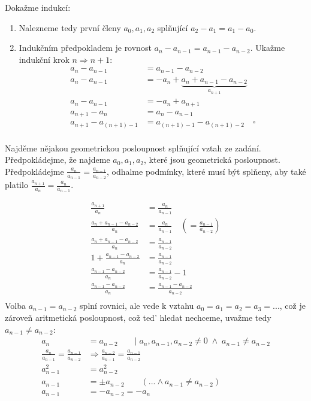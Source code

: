 \documentclass[12pt]{article}
\begin{document}
\begin{enumerate}
\begin{enumerate}
      Dokažme indukcí:
      \begin{enumerate}
        \item Nalezneme tedy první členy $a_0, a_1, a_2$ splňující $a_2-a_1=a_1-a_0$.
        \item Indukčním předpokladem je rovnost $a_n - a_{n-1} = a_{n-1} - a_{n-2}$.
          Ukažme indukční krok $n \Rightarrow n+1$:
          \begin{align*}
            a_n - a_{n-1} &= a_{n-1} - a_{n-2} \\
            a_n - a_{n-1} &= -a_n + \underbrace{a_n + a_{n-1} - a_{n-2}}_{a_{n+1}} \\
            a_n - a_{n-1} &= - a_n + a_{n+1}  \\
            a_{n+1} - a_n &= a_n - a_{n-1} \\
            a_{n+1} - a_{(n+1)-1} &= a_{(n+1)-1} - a_{(n+1)-2} \quad \square\\
          \end{align*}
      \end{enumerate}

      Najděme nějakou geometrickou posloupnost splňující vztah ze zadání.
      Předpokládejme, že najdeme $a_0,a_1,a_2$, které jsou geometrická posloupnost.
      Předpokládejme $\frac{a_n}{a_{n-1}}=\frac{a_{n-1}}{a_{n-2}}$, odhalme podmínky,
      které musí být splňeny, aby také platilo $\frac{a_{n+1}}{a_n} = \frac{a_n}{a_{n-1}}$.

      \begin{align*}
        \frac{a_{n+1}}{a_n} &= \frac{a_n}{a_{n-1}} \\
        \frac{a_n+a_{n-1}-a_{n-2}}{a_n} &= \frac{a_n}{a_{n-1}} \quad\left(= \frac{a_{n-1}}{a_{n-2}}\right) \\
        \frac{a_n+a_{n-1}-a_{n-2}}{a_n} &= \frac{a_{n-1}}{a_{n-2}} \\
        1 + \frac{a_{n-1}-a_{n-2}}{a_n} &= \frac{a_{n-1}}{a_{n-2}} \\
        \frac{a_{n-1}-a_{n-2}}{a_n} &= \frac{a_{n-1}}{a_{n-2}} - 1 \\
        \frac{a_{n-1}-a_{n-2}}{a_n} &= \frac{a_{n-1} - a_{n-2}}{a_{n-2}} \\
      \end{align*}
      Volba $a_{n-1}=a_{n-2}$ splní rovnici, ale vede k vztahu $a_0=a_1=a_2=a_3=...$, což
      je zároveň aritmetická posloupnost, což te{d'} hledat nechceme, uvažme tedy $a_{n-1} \neq a_{n-2}$:
      \begin{align*}
        a_n &= a_{n-2} \quad\quad |\; a_n,a_{n-1},a_{n-2} \neq 0 \;\land\; a_{n-1} \neq a_{n-2}  \\
        \frac{a_n}{a_{n-1}}=\frac{a_{n-1}}{a_{n-2}} &\Rightarrow \frac{a_{n-2}}{a_{n-1}}=\frac{a_{n-1}}{a_{n-2}} \\
        a_{n-1}^2 &= a_{n-2}^2 \\
        a_{n-1} &= \pm a_{n-2} \quad\quad \left(... \land a_{n-1}\neq a_{n-2}\right) \\
        a_{n-1} &= - a_{n-2} = - a_n \\
      \end{align*}


\end{enumerate}
\end{enumerate}
\end{document}
